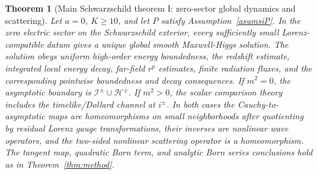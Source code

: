 \documentclass[11pt]{article}
\numberwithin{equation}{section}
\theoremstyle{plain}
\newtheorem{theorem}{Theorem}[section]
\theoremstyle{definition}
\theoremstyle{remark}
\begin{document}
\begin{theorem}[Main Schwarzschild theorem I: zero-sector global dynamics and scattering]\label{thm:main-schwarzschild-intro}
Let \(a=0\), \(K\ge10\), and let \(P\) satisfy Assumption~\ref{asumsiP}.  In the zero electric sector on the Schwarzschild exterior, every sufficiently small Lorenz-compatible datum gives a unique global smooth Maxwell-Higgs solution.  The solution obeys uniform high-order energy boundedness, the redshift estimate, integrated local energy decay, far-field \(r^p\) estimates, finite radiation fluxes, and the corresponding pointwise boundedness and decay consequences.  If \(m^2=0\), the asymptotic boundary is \(\mathcal I^\pm\cup\mathcal H^\pm\).  If \(m^2>0\), the scalar comparison theory includes the timelike/Dollard channel at \(i^\pm\).  In both cases the Cauchy-to-asymptotic maps are homeomorphisms on small neighborhoods after quotienting by residual Lorenz gauge transformations, their inverses are nonlinear wave operators, and the two-sided nonlinear scattering operator is a homeomorphism.  The tangent map, quadratic Born term, and analytic Born series conclusions hold as in Theorem~\ref{thm:method}.
\end{theorem}
\end{document}
